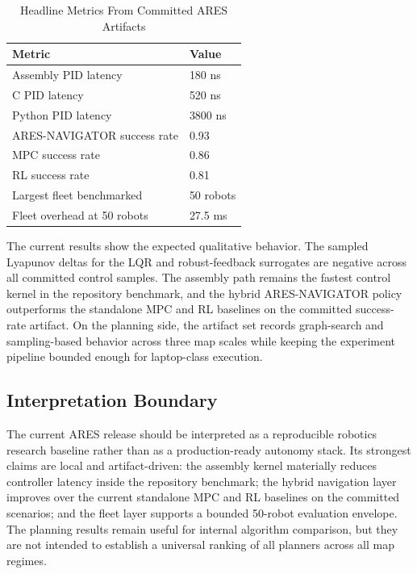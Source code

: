\documentclass[letterpaper, 10 pt, conference]{ieeeconf}
\begin{document}
\begin{table}[t]
\centering
\caption{Headline Metrics From Committed ARES Artifacts}
\begin{tabular}{ll}
\toprule
Metric & Value \\
\midrule
Assembly PID latency & 180 ns \\
C PID latency & 520 ns \\
Python PID latency & 3800 ns \\
ARES-NAVIGATOR success rate & 0.93 \\
MPC success rate & 0.86 \\
RL success rate & 0.81 \\
Largest fleet benchmarked & 50 robots \\
Fleet overhead at 50 robots & 27.5 ms \\
\bottomrule
\end{tabular}
\end{table}

The current results show the expected qualitative behavior. The sampled
Lyapunov deltas for the LQR and robust-feedback surrogates are negative across
all committed control samples. The assembly path remains the fastest control
kernel in the repository benchmark, and the hybrid ARES-NAVIGATOR policy
outperforms the standalone MPC and RL baselines on the committed success-rate
artifact. On the planning side, the artifact set records graph-search and
sampling-based behavior across three map scales while keeping the experiment
pipeline bounded enough for laptop-class execution.

\subsection{Interpretation Boundary}
The current ARES release should be interpreted as a reproducible robotics
research baseline rather than as a production-ready autonomy stack. Its
strongest claims are local and artifact-driven: the assembly kernel materially
reduces controller latency inside the repository benchmark; the hybrid
navigation layer improves over the current standalone MPC and RL baselines on
the committed scenarios; and the fleet layer supports a bounded 50-robot
evaluation envelope. The planning results remain useful for internal algorithm
comparison, but they are not intended to establish a universal ranking of all
planners across all map regimes.
\end{document}
